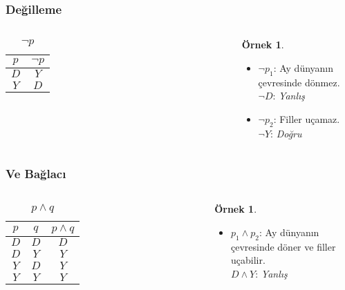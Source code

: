 \documentclass[dvipsnames]{beamer}
\theoremstyle{definition}
\theoremstyle{example}
\newtheorem{ornek}[theorem]{Örnek}
\theoremstyle{plain}
\begin{document}
\begin{frame}
  \frametitle{Değilleme}

  \begin{columns}
    \begin{table}
      \caption{$\neg p$}
      \begin{tabular}{|c||c|}\hline
        $p$ & $\neg p$\\\hline\hline
        $D$ & $Y$     \\\hline
        $Y$ & $D$     \\\hline
      \end{tabular}
    \end{table}

    \pause
    \begin{ornek}
      \begin{itemize}
        \item $\neg p_1$: Ay dünyanın çevresinde dönmez.\\
          $\neg D$: \emph{Yanlış}
        \item $\neg p_2$: Filler uçamaz.\\
          $\neg Y$: \emph{Doğru}
      \end{itemize}
    \end{ornek}
  \end{columns}
\end{frame}

\begin{frame}
  \frametitle{Ve Bağlacı}

  \begin{columns}
    \begin{table}
      \caption{$p \wedge q$}
      \begin{tabular}{|c|c||c|}\hline
        $p$ & $q$ & $p \wedge q$\\\hline\hline
        $D$ & $D$ & $D$         \\\hline
        $D$ & $Y$ & $Y$         \\\hline
        $Y$ & $D$ & $Y$         \\\hline
        $Y$ & $Y$ & $Y$         \\\hline
      \end{tabular}
    \end{table}

    \pause
    \begin{ornek}
      \begin{itemize}
        \item $p_1 \wedge p_2$: Ay dünyanın çevresinde döner ve filler
          uçabilir.\\
          $D \wedge Y$: \emph{Yanlış}
      \end{itemize}
    \end{ornek}
  \end{columns}
\end{frame}
\end{document}
